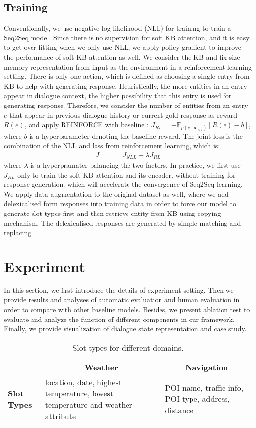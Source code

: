 \documentclass[11pt]{article}
\begin{document}
\subsection{Training}
Conventionally, we use negative log likelihood (NLL) for training to train a Seq2Seq model. 
Since there is no supervision for soft KB attention, and it is easy to get over-fitting when we only use NLL,  we apply policy gradient to improve the performance of soft KB attention as well. We consider the KB and fix-size memory representation from input as the environment in a reinforcement learning setting. There is only one action, which is defined as choosing a single entry from KB to help with generating response. Heuristically, the more entities in an entry appear in dialogue context, the higher possibility that this entry is used for generating response. Therefore, we consider the number of entities from an entry $e$ that appear in previous dialogue history or current gold response as reward $R\left(e\right)$, and apply REINFORCE with baseline \cite{williams:1992:RL}:
$J_{\textit{RL}} = -\mathbb{E}_{p(e\mid \boldsymbol x_{<i})}\left[R\left(e\right) - b\right]$,
where $b$ is a hyperparameter denoting the baseline reward. The joint loss is the combination of the NLL and loss from reinforcement learning, which is:
\begin{align*}
J \quad=\quad J_{\textit{NLL}} + \lambda J_{\textit{RL}}
\end{align*}
where $\lambda$ is a hyperpramater balancing the two factors. In practice, we first use $J_{\textit{RL}}$ only to train the soft KB attention and its encoder, without training for response generation, which will accelerate the convergence of Seq2Seq learning. We apply data augmentation to the original dataset as well, where we add delexicalised form responses into training data in order to force our model to generate slot types first and then retrieve entity from KB using copying mechanism. The delexicalised responses are generated by simple matching and replacing.

\section{Experiment}
In this section, we first introduce the details of experiment setting. Then we provide results and analyses of automatic evaluation and human evaluation in order to compare with other baseline models. Besides, we present ablation test to evaluate and analyze the function of different components in our framework. Finally, we provide visualization of dialogue state representation and case study.
\begin{table}
	\label{table1}
	\begin{tabular}{l|p{6.5cm}|p{6.5cm}}
		&\multicolumn{1}{c|}{\textbf{Weather}}&\multicolumn{1}{c}{\textbf{Navigation}}\\\hline
		\textbf{Slot Types}& location, date, highest temperature, lowest temperature and weather attribute&POI name, traffic info, POI type, address, distance\\
	\end{tabular}
	\caption{Slot types for different domains.}
\end{table}
\end{document}
